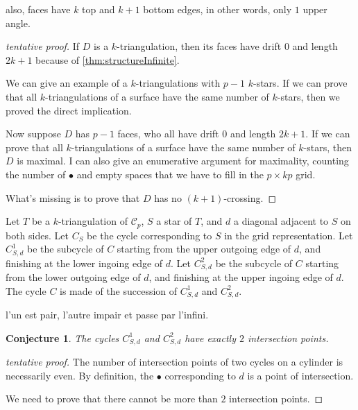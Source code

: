 \documentclass{amsart}
\newtheorem{conjecture}[theorem]{Conjecture}
\theoremstyle{remark}
\begin{document}
also, faces have $k$ top and $k+1$ bottom edges, in other words, only $1$ upper angle.

\begin{proof}[tentative proof]
If $D$ is a $k$-triangulation, then its faces have drift $0$ and length $2k+1$ because of \cref{thm:structureInfinite}.

We can give an example of a $k$-triangulations with $p-1$ $k$-stars. If we can prove that all $k$-triangulations of a surface have the same number of $k$-stars, then we proved the direct implication.

Now suppose $D$ has $p-1$ faces, who all have drift $0$ and length $2k+1$. 
If we can prove that all $k$-triangulations of a surface have the same number of $k$-stars, then $D$ is maximal. I can also give an enumerative argument for maximality, counting the number of $\bullet$ and empty spaces that we have to fill in the $p\times kp$ grid.

What's missing is to prove that $D$ has no $(k+1)$-crossing.
\end{proof}


Let $T$ be a $k$-triangulation of $\mathcal{C}_p$, $S$ a star of $T$, and $d$ a diagonal adjacent to $S$ on both sides.
Let $C_S$ be the cycle corresponding to $S$ in the grid representation.
Let $C_{S,d}^1$ be the subcycle of $C$ starting from the upper outgoing edge of $d$, and finishing at the lower ingoing edge of $d$.
Let $C_{S,d}^2$ be the subcycle of $C$ starting from the lower outgoing edge of $d$, and finishing at the upper ingoing edge of $d$.
The cycle $C$ is made of the succession of $C_{S,d}^1$ and $C_{S,d}^2$.

l'un est pair, l'autre impair et passe par l'infini. 

\begin{conjecture}
The cycles $C_{S,d}^1$ and $C_{S,d}^2$ have exactly $2$ intersection points.
\end{conjecture}

\begin{proof}[tentative proof]
The number of intersection points of two cycles on a cylinder is necessarily even. By definition, the $\bullet$ corresponding to $d$ is a point of intersection.

We need to prove that there cannot be more than $2$ intersection points.
\end{proof}
\end{document}
